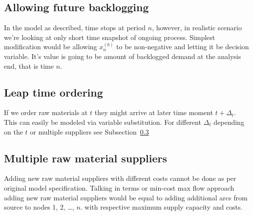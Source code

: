 \subsection{Allowing future backlogging}
\label{subs:Allowing future backlogging}
In the model as described, time stops at period $n$, however, in realistic scenario we're looking at only short time snapshot of ongoing process. Simplest modification would be allowing $x^{(b)}_n$ to be non-negative and letting it be decision variable. It's value is going to be amount of backlogged demand at the analysis end, that is time $n$.

\subsection{Leap time ordering}
\label{subs:leap-time-ordering}
If we order raw materials at $t$ they might arrive at later time moment $t+\Delta_t$. This can easily be modeled via variable substitution. For different $\Delta_t$ depending on the $t$ or multiple suppliers see Subsection~\ref{subs:Multiple raw material suppliers}

\subsection{Multiple raw material suppliers}
\label{subs:Multiple raw material suppliers}
Adding new raw material suppliers with different costs cannot be done as per original model specification. Talking in terms or min-cost max flow approach adding new raw material suppliers would be equal to adding additional arcs from source to nodes 1, 2, \ldots, $n$. with respective maximum supply capacity and costs.
